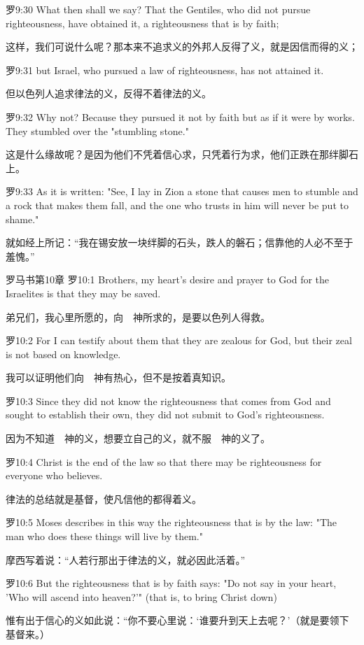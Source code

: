 \documentclass[a4paper,11pt,onecolumn,twoside]{ctexart}
\begin{document}
\begin{multicols}{2}
 罗9:30
 What then shall we say? That the Gentiles, who did not pursue righteousness, have obtained it, a righteousness that is by faith;

 这样，我们可说什么呢？那本来不追求义的外邦人反得了义，就是因信而得的义；


 罗9:31
 but Israel, who pursued a law of righteousness, has not attained it.

 但以色列人追求律法的义，反得不着律法的义。


 罗9:32
 Why not? Because they pursued it not by faith but as if it were by works. They stumbled over the "stumbling stone."

 这是什么缘故呢？是因为他们不凭着信心求，只凭着行为求，他们正跌在那绊脚石上。


 罗9:33
 As it is written: "See, I lay in Zion a stone that causes men to stumble and a rock that makes them fall, and the one who trusts in him will never be put to shame."

 就如经上所记：“我在锡安放一块绊脚的石头，跌人的磐石；信靠他的人必不至于羞愧。”


 罗马书第10章
 罗10:1
 Brothers, my heart's desire and prayer to God for the Israelites is that they may be saved.

 弟兄们，我心里所愿的，向　神所求的，是要以色列人得救。


 罗10:2
 For I can testify about them that they are zealous for God, but their zeal is not based on knowledge.

 我可以证明他们向　神有热心，但不是按着真知识。


 罗10:3
 Since they did not know the righteousness that comes from God and sought to establish their own, they did not submit to God's righteousness.

 因为不知道　神的义，想要立自己的义，就不服　神的义了。


 罗10:4
 Christ is the end of the law so that there may be righteousness for everyone who believes.

 律法的总结就是基督，使凡信他的都得着义。


 罗10:5
 Moses describes in this way the righteousness that is by the law: "The man who does these things will live by them."

 摩西写着说：“人若行那出于律法的义，就必因此活着。”


 罗10:6
 But the righteousness that is by faith says: "Do not say in your heart, 'Who will ascend into heaven?'" (that is, to bring Christ down)

 惟有出于信心的义如此说：“你不要心里说：‘谁要升到天上去呢？’（就是要领下基督来。）



\end{multicols}
\end{document}
